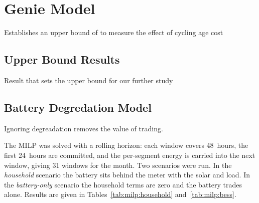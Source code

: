 %

\section{Genie Model}
Establishes an upper bound of to measure the effect of cycling age cost

\subsection{Upper Bound Results}
Result that sets the upper bound for our further study


\subsection{Battery Degredation Model}
Ignoring degreadation removes the value of trading. 

The MILP was solved with a rolling horizon: each window covers 48~hours, the first
24~hours are committed, and the per-segment energy is carried into the next window,
giving 31 windows for the month. Two scenarios were run. In the \emph{household}
scenario the battery sits behind the meter with the solar and load. In the
\emph{battery-only} scenario the household terms are zero and the battery trades alone.
Results are given in Tables~\ref{tab:milp:household} and~\ref{tab:milp:bess}.

